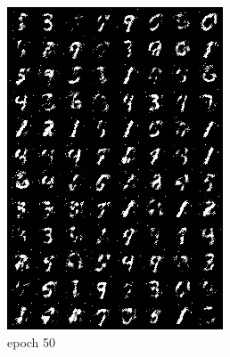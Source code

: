 \documentclass[a4paper]{article}
\theoremstyle{definition}
\newenvironment{soln}{
	\leavevmode\color{blue}\ignorespaces
}{}
\begin{document}
\begin{enumerate} [label=(\alph*)]
\begin{soln}
\begin{soln}
\begin{figure}[H]
\begin{subfigure}[b]{0.3\textwidth}
						\includegraphics[width=\textwidth]{../outputs-c-nadm-smooth/gen_img50.png}
						\caption{epoch 50}
					\end{subfigure}
					\hfill
					\begin{subfigure}[b]{0.3\textwidth}
						\centering

\end{subfigure}
\end{figure}
\end{soln}
\end{soln}
\end{enumerate}
\end{document}
